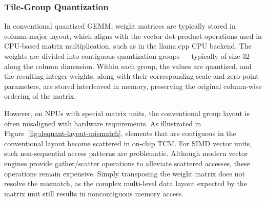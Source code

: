 


\subsubsection{Tile-Group Quantization}

In conventional quantized GEMM, weight matrices are typically stored in column-major layout, which aligns with the vector dot-product operations used in CPU-based matrix multiplication, such as in the llama.cpp CPU backend. The weights are divided into contiguous quantization groups — typically of size 32 — along the column dimension. Within each group, the values are quantized, and the resulting integer weights, along with their corresponding scale and zero-point parameters, are stored interleaved in memory, preserving the original column-wise ordering of the matrix.

However, on NPUs with special matrix units, the conventional group layout is often misaligned with hardware requirements. As illustrated in Figure~\ref{fig:dequant-layout-mismatch}, elements that are contiguous in the conventional layout become scattered in on-chip TCM. For SIMD vector units, such non-sequential access patterns are problematic. Although modern vector engines provide gather/scatter operations to alleviate scattered accesses, these operations remain expensive. Simply transposing the weight matrix does not resolve the mismatch, as the complex multi-level data layout expected by the matrix unit still results in noncontiguous memory access.

